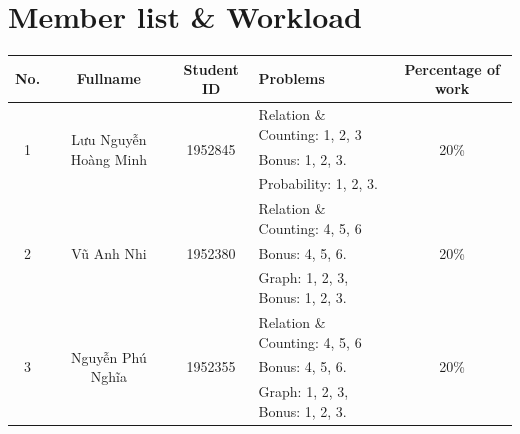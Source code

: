\documentclass[a4paper]{article}
\begin{document}

\newpage
\tableofcontents
\newpage


\section*{Member list \& Workload}

\begin{center}
  \begin{tabular}{|c|c|c|l|c|}
    \hline
    \textbf{No.}       & \textbf{Fullname}                      & \textbf{Student ID}      & \textbf{Problems}                             & \textbf{Percentage of work} \\
    \hline
    \multirow{3}{*}{1} & \multirow{3}{*}{Lưu Nguyễn Hoàng Minh} & \multirow{3}{*}{1952845} & \textendash{} Relation \& Counting: 1, 2, 3   & \multirow{3}{*}{20\%}       \\
                       &                                        &                          & Bonus: 1, 2, 3.                               &                             \\
                       &                                        &                          & \textendash{} Probability: 1, 2, 3.           &                             \\
    \hline
    \multirow{3}{*}{2} & \multirow{3}{*}{Vũ Anh Nhi}            & \multirow{3}{*}{1952380} & \textendash{} Relation \& Counting: 4, 5, 6   & \multirow{3}{*}{20\%}       \\
                       &                                        &                          & Bonus: 4, 5, 6.                               &                             \\
                       &                                        &                          & \textendash{} Graph: 1, 2, 3, Bonus: 1, 2, 3. &                             \\
    \hline
    \multirow{3}{*}{3} & \multirow{3}{*}{Nguyễn Phú Nghĩa}      & \multirow{3}{*}{1952355} & \textendash{} Relation \& Counting: 4, 5, 6   & \multirow{3}{*}{20\%}       \\
                       &                                        &                          & Bonus: 4, 5, 6.                               &                             \\
                       &                                        &                          & \textendash{} Graph: 1, 2, 3, Bonus: 1, 2, 3. &                             \\

\end{tabular}
\end{center}
\end{document}
